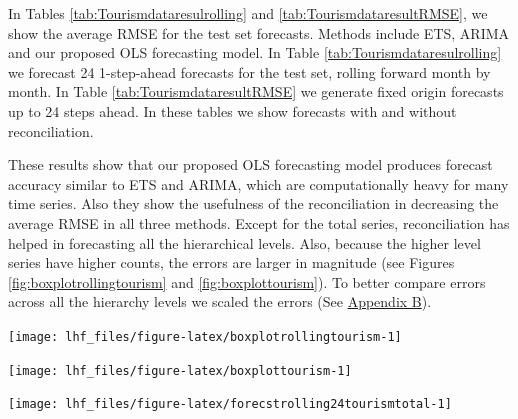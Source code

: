 \documentclass[11pt,a4paper,]{article}
\let\origfigure\figure
\let\endorigfigure\endfigure
\renewenvironment{figure}[1][2] {
    \expandafter\origfigure\expandafter[!htbp]
} {
    \endorigfigure
}
\begin{document}
In Tables \ref{tab:Tourismdataresulrolling} and
\ref{tab:TourismdataresultRMSE}, we show the average RMSE for the test
set forecasts. Methods include ETS, ARIMA and our proposed OLS
forecasting model. In Table \ref{tab:Tourismdataresulrolling} we
forecast 24 1-step-ahead forecasts for the test set, rolling forward
month by month. In Table \ref{tab:TourismdataresultRMSE} we generate
fixed origin forecasts up to 24 steps ahead. In these tables we show
forecasts with and without reconciliation.

These results show that our proposed OLS forecasting model produces
forecast accuracy similar to ETS and ARIMA, which are computationally
heavy for many time series. Also they show the usefulness of the
reconciliation in decreasing the average RMSE in all three methods.
Except for the total series, reconciliation has helped in forecasting
all the hierarchical levels. Also, because the higher level series have
higher counts, the errors are larger in magnitude (see Figures
\ref{fig:boxplotrollingtourism} and \ref{fig:boxplottourism}). To better
compare errors across all the hierarchy levels we scaled the errors (See
\protect\hyperlink{appendixB}{Appendix B}).

\begin{figure}

{\centering \texttt{[image: lhf\_files/figure-latex/boxplotrollingtourism-1]} 

}

\caption{Box plots of rolling origin forecast errors from reconciled and unreconciled ETS, ARIMA and OLS methods at each hierarchical level for tourism demand.}\label{fig:boxplotrollingtourism}
\end{figure}

\begin{figure}

{\centering \texttt{[image: lhf\_files/figure-latex/boxplottourism-1]} 

}

\caption{Box plots of fixed origin forecast errors for reconciled and unreconciled ETS, ARIMA and OLS methods at each hierarchical level for tourism demand.}\label{fig:boxplottourism}
\end{figure}

\begin{figure}

{\centering \texttt{[image: lhf\_files/figure-latex/forecstrolling24tourismtotal-1]} 

}

\caption{The actual test set for the 'Total series' compared to the forecasts from reconciled and unreconciled ETS, ARIMA and OLS methods for rolling and fixed origin tourism demand.}\label{fig:forecstrolling24tourismtotal}
\end{figure}
\end{document}
